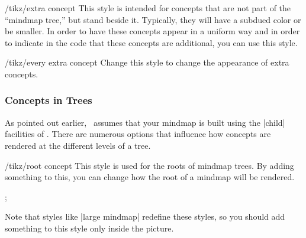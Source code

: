 \begin{stylekey}{/tikz/extra concept}
  This style is intended for concepts that are not part of the
  ``mindmap tree,'' but stand beside it. Typically, they will have a
  subdued color or be smaller. In order to have these concepts appear
  in a uniform way and in order to indicate in the code that these
  concepts are additional, you can use this style.
\begin{codeexample}[]
\end{codeexample}
  \begin{stylekey}{/tikz/every extra concept}
    Change this style to change the appearance of extra concepts.
  \end{stylekey}
\end{stylekey}


\subsubsection{Concepts in Trees}

As pointed out earlier, \tikzname\ assumes that your mindmap is built
using the |child| facilities of \tikzname. There are numerous options
that influence how concepts are rendered at the different levels of a
tree.

\begin{stylekey}{/tikz/root concept}
  This style is used for the roots of mindmap trees. By adding
  something to this, you can change how the root of a mindmap will be
  rendered.
\begin{codeexample}[]
\tikz
  [root concept/.append style={concept color=blue!80,minimum size=3.5cm},
   mindmap]
  ;
\end{codeexample}

  Note that styles like |large mindmap| redefine these styles, so you
  should add something to this style only inside the picture.
\end{stylekey}

